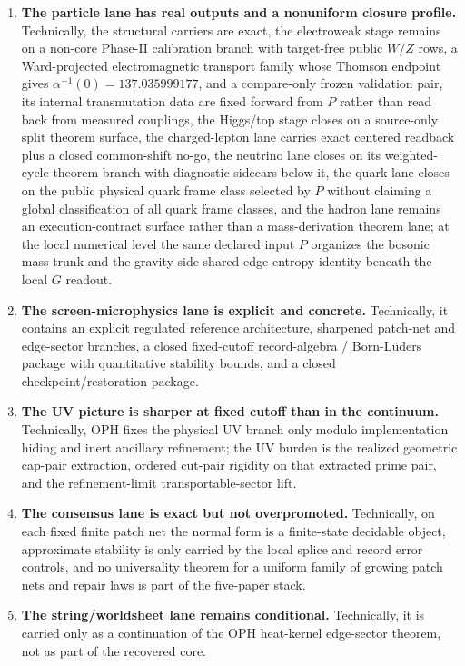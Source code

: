 \documentclass[11pt]{article}
\begin{document}
\begin{enumerate}[leftmargin=2em]
\item \textbf{The particle lane has real outputs and a nonuniform closure profile.}
Technically, the structural carriers are exact, the electroweak stage remains on a non-core
Phase-II calibration branch with target-free public \(W/Z\) rows, a Ward-projected
electromagnetic transport family whose Thomson endpoint gives
\(\alpha^{-1}(0)=137.035999177\), and a compare-only frozen validation pair, its internal
transmutation data are fixed forward from \(P\) rather than read back from measured couplings, the
Higgs/top stage closes on a source-only split theorem surface, the charged-lepton lane carries
exact centered readback plus a closed common-shift no-go, the neutrino lane closes on its
weighted-cycle theorem branch with diagnostic sidecars below it, the quark lane closes on the
public physical quark frame class selected by \(P\) without claiming a global classification of
all quark frame classes, and the hadron lane remains an execution-contract surface rather than a
mass-derivation theorem lane; at the local numerical level the same declared input \(P\) organizes
the bosonic mass trunk and the gravity-side shared edge-entropy identity beneath the local \(G\)
readout.
\item \textbf{The screen-microphysics lane is explicit and concrete.} Technically, it
contains an explicit regulated reference architecture, sharpened patch-net and edge-sector
branches, a closed fixed-cutoff record-algebra / Born-L\"uders package with quantitative stability
bounds, and a closed checkpoint/restoration package.
\item \textbf{The UV picture is sharper at fixed cutoff than in the continuum.} Technically, OPH
fixes the physical UV branch only modulo implementation hiding and inert ancillary refinement; the
UV burden is the realized geometric cap-pair extraction, ordered cut-pair rigidity on that
extracted prime pair, and the refinement-limit transportable-sector lift.
\item \textbf{The consensus lane is exact but not overpromoted.} Technically, on each fixed finite
patch net the normal form is a finite-state decidable object, approximate stability is only
carried by the local splice and record error controls, and no universality theorem for a uniform
family of growing patch nets and repair laws is part of the five-paper stack.
\item \textbf{The string/worldsheet lane remains conditional.} Technically, it is carried only as
a continuation of the OPH heat-kernel edge-sector theorem, not as part of the recovered core.
\end{enumerate}
\end{document}
